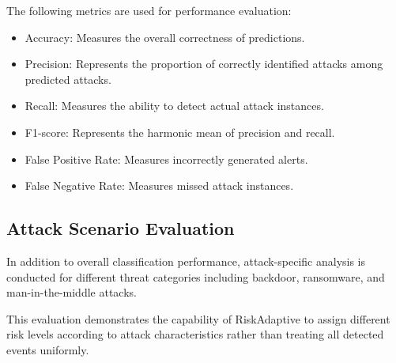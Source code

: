 The following metrics are used for performance evaluation:

\begin{itemize}
\item Accuracy: Measures the overall correctness of predictions.
\item Precision: Represents the proportion of correctly identified
attacks among predicted attacks.
\item Recall: Measures the ability to detect actual attack instances.
\item F1-score: Represents the harmonic mean of precision and recall.
\item False Positive Rate: Measures incorrectly generated alerts.
\item False Negative Rate: Measures missed attack instances.
\end{itemize}


\subsection{Attack Scenario Evaluation}

In addition to overall classification performance, attack-specific
analysis is conducted for different threat categories including
backdoor, ransomware, and man-in-the-middle attacks.

This evaluation demonstrates the capability of RiskAdaptive to assign
different risk levels according to attack characteristics rather than
treating all detected events uniformly.
